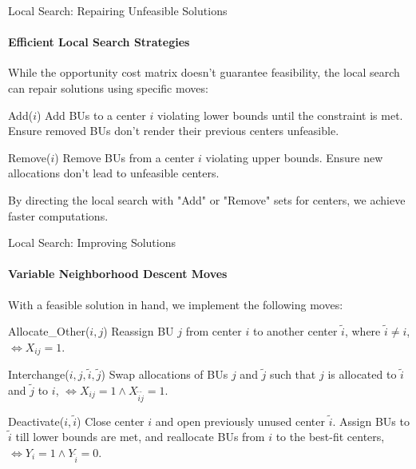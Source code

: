 \documentclass{beamer}
\begin{document}
\begin{frame}{Local Search: Repairing Unfeasible Solutions}
    \framesubtitle{Efficient Local Search Strategies}
    \scriptsize 
    While the opportunity cost matrix doesn't guarantee feasibility, the local search can repair solutions using specific moves:

    \begin{block}{Add($i$)}
        \centering
        \footnotesize 
        Add BUs to a center $i$ violating lower bounds until the constraint is met. Ensure removed BUs don't render their previous centers unfeasible.
    \end{block}

    \begin{block}{Remove($i$)}
        \centering
        \footnotesize 
        Remove BUs from a center $i$ violating upper bounds. Ensure new allocations don't lead to unfeasible centers.
    \end{block}
    
    \scriptsize
    By directing the local search with "Add" or "Remove" sets for centers, we achieve faster computations.
\end{frame}
\begin{frame}{Local Search: Improving Solutions}
    \framesubtitle{Variable Neighborhood Descent Moves}
    \scriptsize 
    With a feasible solution in hand, we implement the following moves:

    \begin{block}{Allocate\_Other($i, j$)}
        \centering
        \footnotesize 
        Reassign BU $j$ from center $i$ to another center $\tilde{i}$, where $\tilde{i} \ne i$, $\iff X_{ij} = 1$.
    \end{block}

    \begin{block}{Interchange($i, j, \tilde{i}, \tilde{j}$)}
        \centering
        \footnotesize 
        Swap allocations of BUs $j$ and $\tilde{j}$ such that $j$ is allocated to $\tilde{i}$ and $\tilde{j}$ to $i$, $\iff X_{ij} = 1 \wedge X_{\tilde{i}\tilde{j}} = 1$.
    \end{block}
    
    \begin{block}{Deactivate($i, \tilde{i}$)}
        \centering
        \footnotesize 
        Close center $i$ and open previously unused center $\tilde{i}$. Assign BUs to $\tilde{i}$ till lower bounds are met, and reallocate BUs from $i$ to the best-fit centers, $\iff Y_{i} = 1 \land  Y_{\tilde{i}} = 0$.
    \end{block}
    
\end{frame}
\end{document}
